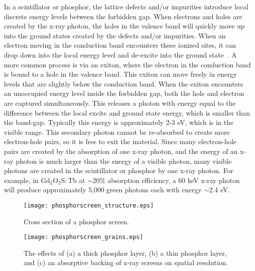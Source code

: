 In a scintillator or phosphor, the lattice defects and/or impurities introduce local discrete energy levels between the forbidden gap.  When electrons and holes are created by the x-ray photon, the holes in the valence band will quickly move up into the ground states created by the defects and/or impurities.  When an electron moving in the conduction band encounters these ionized sites, it can drop down into the local energy level and de-excite into the ground state~\citep{Knoll2010}.  A more common process is via an exiton, where the electron in the conduction band is bound to a hole in the valence band.  This exiton can move freely in energy levels that are slightly below the conduction band.  When the exiton encounters an unoccupied energy level inside the forbidden gap, both the hole and electron are captured simultaneously.  This releases a photon with energy equal to the difference between the local excite and ground state energy, which is smaller than the band-gap.  Typically this energy is approximately 2-3 eV, which is in the visible range.  This secondary photon cannot be re-absorbed to create more electron-hole pairs, so it is free to exit the material.  Since many electron-hole pairs are created by the absorption of one x-ray photon, and the energy of an x-ray photon is much larger than the energy of a visible photon, many visible photons are created in the scintillator or phosphor by one x-ray photon.  For example, in $\mathrm{Gd_2O_2S:Tb}$ at $\sim$20$\%$ absorption efficiency, a 60 keV x-ray photon will produce approximately 5,000 green photons each with energy $\sim$2.4 eV.

\begin{figure}[ht]
	\texttt{[image: phosphorscreen\_structure.eps]}
	\caption[]{Cross section of a phosphor screen\footnotemark.}
\label{fig:phosphor_cross_section}
\end{figure}

\begin{figure}[ht]
\texttt{[image: phosphorscreen\_grains.eps]}
\caption{The effects of (a) a thick phosphor layer, (b) a thin phosphor layer, and (c) an absorptive backing of x-ray screens on spatial resolution.}
\label{fig:phosphor_effects}
\end{figure}

